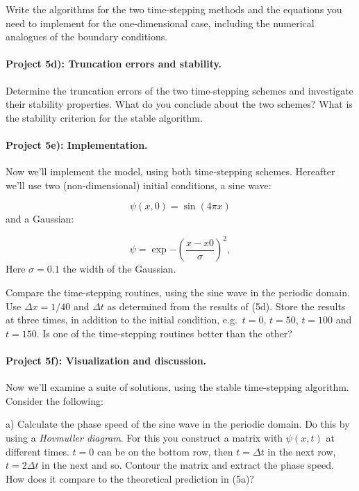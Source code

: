 \documentclass[%
oneside,                 %
final,                   %
10pt]{article}
\begin{document}
Write the algorithms for the two time-stepping methods and the
equations you need to implement for the one-dimensional case,
including the numerical analogues of the boundary conditions.


\paragraph{Project 5d): Truncation errors and stability.}
Determine the truncation errors of the two time-stepping schemes
and investigate their stability properties. What do you conclude
about the two schemes? What is the stability criterion for the
stable algorithm.


\paragraph{Project 5e): Implementation.}
Now we'll implement the model, using both time-stepping schemes.
Hereafter we'll use two (non-dimensional) initial
conditions, a sine wave:

\begin{equation}
\psi(x,0) = \sin{\left( 4\pi x \right)}
\end{equation}
and a Gaussian:

\begin{equation}
\psi = \exp{-\left(\frac{x-x0}{\sigma}\right)^2},
\end{equation}
Here $\sigma = 0.1$ the width of the Gaussian.

Compare the time-stepping routines, using the sine wave in the
periodic domain. Use $\Delta x=1/40$ and $\Delta t$ as determined from the
results of (5d). Store the results at three times, in addition to the
initial condition, e.g.~$t=0$, $t=50$, $t=100$ and $t=150$.  Is one of the
time-stepping routines better than the other?


\paragraph{Project 5f): Visualization and discussion.}
Now we'll examine a suite of solutions, using the stable time-stepping
algorithm. Consider the following:

a) Calculate the phase speed of the sine wave in the periodic domain.
Do this by using a \emph{Hovmuller diagram}.  For this you construct a
matrix with $\psi(x,t)$ at different times. $t=0$ can be on the bottom
row, then $t=\Delta t$ in the next row, $t=2\Delta t$ in the next and
so. Contour the matrix and extract the phase speed. How does it
compare to the theoretical prediction in (5a)?
\end{document}
